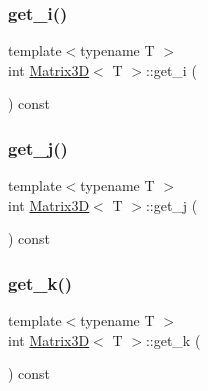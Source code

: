 \mbox{\label{classMatrix3D_af02576e685de872ba1b75014d9a609c9}} 
\subsubsection{\texorpdfstring{get\+\_\+i()}{get\_i()}}
{\footnotesize\ttfamily template$<$typename T $>$ \\
int \mbox{\hyperlink{classMatrix3D}{Matrix3D}}$<$ T $>$\+::get\+\_\+i (\begin{DoxyParamCaption}{ }\end{DoxyParamCaption}) const}

\mbox{\label{classMatrix3D_a083e3f136a0108aad991e194b078db7f}} 
\subsubsection{\texorpdfstring{get\+\_\+j()}{get\_j()}}
{\footnotesize\ttfamily template$<$typename T $>$ \\
int \mbox{\hyperlink{classMatrix3D}{Matrix3D}}$<$ T $>$\+::get\+\_\+j (\begin{DoxyParamCaption}{ }\end{DoxyParamCaption}) const}

\mbox{\label{classMatrix3D_a35fad9c3c81914e0ef5ed40ceda5d324}} 
\subsubsection{\texorpdfstring{get\+\_\+k()}{get\_k()}}
{\footnotesize\ttfamily template$<$typename T $>$ \\
int \mbox{\hyperlink{classMatrix3D}{Matrix3D}}$<$ T $>$\+::get\+\_\+k (\begin{DoxyParamCaption}{ }\end{DoxyParamCaption}) const}

\mbox{\label{classMatrix3D_ac21cf8967053b928f609b98abf1616e2}} 
